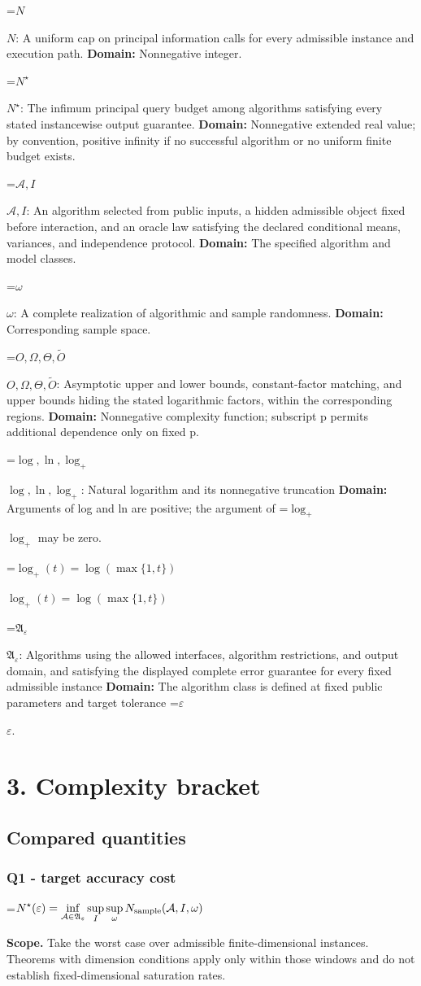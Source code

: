 \documentclass[10pt,a4paper]{article}
\newcommand{\AtlasMath}[1]{\par\begingroup\centering\setbox0=\hbox{$\displaystyle #1$}\ifdim\wd0>1.4\linewidth\typeout{ATLAS WIDE FORMULA: \the\wd0}\fi\ifdim\wd0>\linewidth\resizebox{\linewidth}{!}{\box0}\else\box0\fi\par\endgroup}
\newcommand{\AtlasInlineMath}[1]{\begingroup\setbox0=\hbox{$#1$}\ifdim\wd0>.4\linewidth\endgroup\AtlasMath{#1}\else\endgroup$#1$\fi}
\begin{document}
\AtlasInlineMath{N}: A uniform cap on principal information calls for every admissible instance and execution path. \textbf{Domain:} Nonnegative integer.

\AtlasInlineMath{N^\star}: The infimum principal query budget among algorithms satisfying every stated instancewise output guarantee. \textbf{Domain:} Nonnegative extended real value; by convention, positive infinity if no successful algorithm or no uniform finite budget exists.

\AtlasInlineMath{\mathcal A,I}: An algorithm selected from public inputs, a hidden admissible object fixed before interaction, and an oracle law satisfying the declared conditional means, variances, and independence protocol. \textbf{Domain:} The specified algorithm and model classes.

\AtlasInlineMath{\omega}: A complete realization of algorithmic and sample randomness. \textbf{Domain:} Corresponding sample space.

\AtlasInlineMath{O,\Omega,\Theta,\widetilde O}: Asymptotic upper and lower bounds, constant-factor matching, and upper bounds hiding the stated logarithmic factors, within the corresponding regions. \textbf{Domain:} Nonnegative complexity function; subscript p permits additional dependence only on fixed p.

\AtlasInlineMath{\log,\ln,\log_+}: Natural logarithm and its nonnegative truncation \textbf{Domain:} Arguments of log and ln are positive; the argument of \AtlasInlineMath{\log_+} may be zero.

\AtlasInlineMath{\log_+(t)=\log(\max\{1,t\})}

\AtlasInlineMath{\mathfrak A_\varepsilon}: Algorithms using the allowed interfaces, algorithm restrictions, and output domain, and satisfying the displayed complete error guarantee for every fixed admissible instance \textbf{Domain:} The algorithm class is defined at fixed public parameters and target tolerance \AtlasInlineMath{\varepsilon}.

\section{3. Complexity bracket}
\subsection{Compared quantities}
\subsubsection{Q1 - target accuracy cost}
\AtlasMath{N^\star(\varepsilon)=\inf_{\mathcal A\in\mathfrak A_\varepsilon}\sup_I \sup_\omega N_{\rm sample}(\mathcal A,I,\omega)}
\textbf{Scope.} Take the worst case over admissible finite-dimensional instances. Theorems with dimension conditions apply only within those windows and do not establish fixed-dimensional saturation rates.
\end{document}
